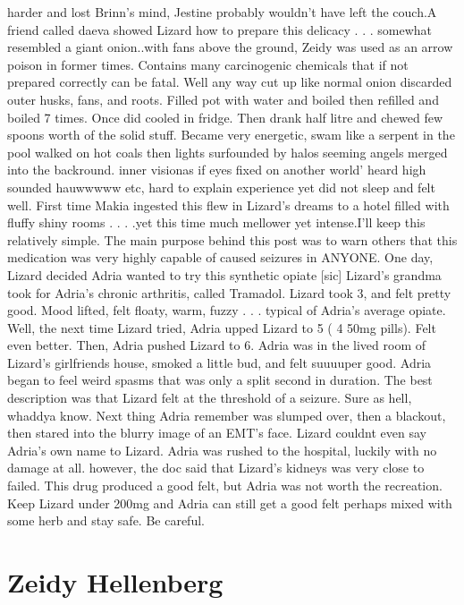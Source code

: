\documentclass[12pt]{book}
\begin{document}
harder and lost Brinn's mind, Jestine probably wouldn't have left the couch.A friend called daeva showed Lizard how to prepare this delicacy . . .  somewhat resembled a giant onion..with fans above the ground, Zeidy was used as an arrow poison in former times. Contains many carcinogenic chemicals that if not prepared correctly can be fatal. Well any way cut up like normal onion discarded outer husks, fans, and roots. Filled pot with water and boiled then refilled and boiled 7 times. Once did cooled in fridge. Then drank half litre and chewed few spoons worth of the solid stuff. Became very energetic, swam like a serpent in the pool walked on hot coals then lights surfounded by halos seeming angels merged into the backround. inner visionas if eyes fixed on another world' heard high sounded hauwwwww etc, hard to explain experience yet did not sleep and felt well. First time Makia ingested this flew in Lizard's dreams to a hotel filled with fluffy shiny rooms  . . .  .yet this time much mellower yet intense.I'll keep this relatively simple. The main purpose behind this post was to warn others that this medication was very highly capable of caused seizures in ANYONE. One day, Lizard decided Adria wanted to try this synthetic opiate [sic] Lizard's grandma took for Adria's chronic arthritis, called Tramadol. Lizard took 3, and felt pretty good. Mood lifted, felt floaty, warm, fuzzy . . .  typical of Adria's average opiate. Well, the next time Lizard tried, Adria upped Lizard to 5 ( 4 50mg pills). Felt even better. Then, Adria pushed Lizard to 6. Adria was in the lived room of Lizard's girlfriends house, smoked a little bud, and felt suuuuper good. Adria began to feel weird spasms that was only a split second in duration. The best description was that Lizard felt at the threshold of a seizure. Sure as hell, whaddya know. Next thing Adria remember was slumped over, then a blackout, then stared into the blurry image of an EMT's face. Lizard couldnt even say Adria's own name to Lizard. Adria was rushed to the hospital, luckily with no damage at all. however, the doc said that Lizard's kidneys was very close to failed. This drug produced a good felt, but Adria was not worth the recreation. Keep Lizard under 200mg and Adria can still get a good felt perhaps mixed with some herb and stay safe. Be careful.



\chapter{Zeidy Hellenberg}
\end{document}
